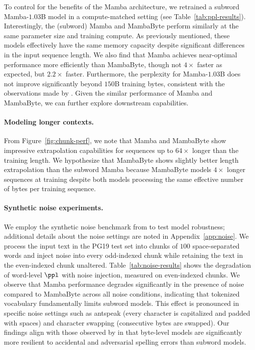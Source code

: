 To control for the benefits of the Mamba architecture, we retrained a subword Mamba-$1.03$B model in a compute-matched setting (see Table~\ref{tab:ppl-results}). Interestingly, the (subword) Mamba and MambaByte perform similarly at the same parameter size and training compute. As previously mentioned, these models effectively have the same memory capacity despite significant differences in the input sequence length. We also find that Mamba achieves near-optimal performance more efficiently than MambaByte, though not $4\times$ faster as expected, but $2.2\times$ faster. Furthermore, the perplexity for Mamba-$1.03$B does not improve significantly beyond $150$B training bytes, consistent with the observations made by \citet{rae2020compressive}. Given the similar performance of Mamba and MambaByte, we can further explore downstream capabilities.

\paragraph{Modeling longer contexts.} From Figure~\ref{fig:chunk-perf}, we note that Mamba and MambaByte show impressive extrapolation capabilities for sequences up to $64\times$ longer than the training length. We hypothesize that MambaByte shows slightly better length extrapolation than the subword Mamba because MambaByte models $4\times$ longer sequences at training despite both models processing the same effective number of bytes per training sequence.

\paragraph{Synthetic noise experiments.} We employ the synthetic noise benchmark from \citet{xue2022byt5} to test model robustness; additional details about the noise settings are noted in Appendix~\ref{app:noise}. We process the input text in the PG19 test set into chunks of $100$ space-separated words and inject noise into every odd-indexed chunk while retaining the text in the even-indexed chunk unaltered. Table~\ref{tab:noise-results} shows the degradation of word-level $\ppl$ with noise injection, measured on even-indexed chunks. We observe that Mamba performance degrades significantly in the presence of noise compared to MambaByte across all noise conditions, indicating that tokenized vocabulary fundamentally limits subword models. This effect is pronounced in specific noise settings such as antspeak (every character is capitalized and padded with spaces) and character swapping (consecutive bytes are swapped). Our findings align with those observed by \citet{xue2022byt5} in that byte-level models are significantly more resilient to accidental and adversarial spelling errors than subword models.

